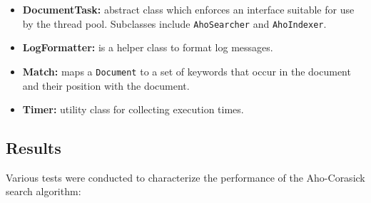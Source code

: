 \documentclass[10pt]{report}
\begin{document}
\begin{itemize}
\item \textbf{DocumentTask:} abstract class which enforces an
  interface suitable for use by the thread pool. Subclasses include
  \texttt{AhoSearcher} and \texttt{AhoIndexer}.

\item \textbf{LogFormatter:} is a helper class to format log messages.

\item \textbf{Match:} maps a \texttt{Document} to a set of keywords
  that occur in the document and their position with the document.

\item \textbf{Timer:} utility class for collecting execution times.
\end{itemize}


\subsection*{Results}
Various tests were conducted to characterize the performance of the
Aho-Corasick search algorithm:
\end{document}
